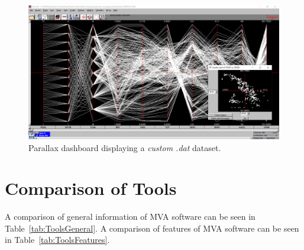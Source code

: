 \begin{figure}[tp]
\centering
\includegraphics[keepaspectratio,width=\linewidth,height=\halfh]
{images/screenshot-parallax.png}

\caption[Parallax Dashboard Screenshot]
{%
Parallax dashboard displaying a \emph{custom .dat} dataset.
}
\label{fig:ScreenshotParallax}
\end{figure}




\section{Comparison of Tools}

A comparison of general information of MVA software can be seen in
Table~\ref{tab:ToolsGeneral}. A comparison of features of MVA software can
be seen in Table~\ref{tab:ToolsFeatures}.





